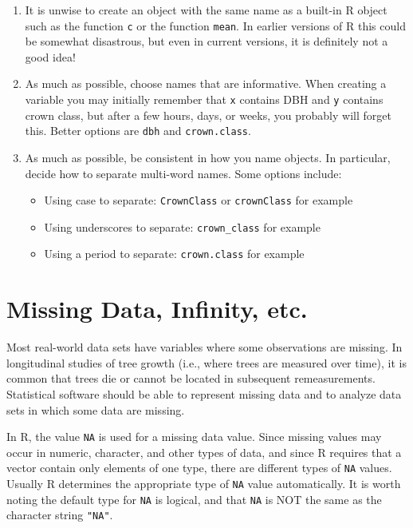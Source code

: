 \documentclass[]{krantz}
\providecommand{\tightlist}{%
  \setlength{\itemsep}{0pt}\setlength{\parskip}{0pt}}
\begin{document}
\begin{enumerate}
\def\labelenumi{\arabic{enumi}.}
\setcounter{enumi}{1}
\item
  It is unwise to create an object with the same name as a built-in R object such as the function \texttt{c} or the function \texttt{mean}. In earlier versions of R this could be somewhat disastrous, but even in current versions, it is definitely not a good idea!
\item
  As much as possible, choose names that are informative. When creating a variable you may initially remember that \texttt{x} contains DBH and \texttt{y} contains crown class, but after a few hours, days, or weeks, you probably will forget this. Better options are \texttt{dbh} and \texttt{crown.class}.
\item
  As much as possible, be consistent in how you name objects. In particular, decide how to separate multi-word names. Some options include:

  \begin{itemize}
  \tightlist
  \item
    Using case to separate: \texttt{CrownClass} or \texttt{crownClass} for example
  \item
    Using underscores to separate: \texttt{crown\_class} for example
  \item
    Using a period to separate: \texttt{crown.class} for example
  \end{itemize}
\end{enumerate}

\hypertarget{missing-data-infinity-etc.}{%
\section{Missing Data, Infinity, etc.}\label{missing-data-infinity-etc.}}

Most real-world data sets have variables where some observations are missing. In longitudinal studies of tree growth (i.e., where trees are measured over time), it is common that trees die or cannot be located in subsequent remeasurements. Statistical software should be able to represent missing data and to analyze data sets in which some data are missing.

In R, the value \texttt{NA} is used for a missing data value. Since missing values may occur in numeric, character, and other types of data, and since R requires that a vector contain only elements of one type, there are different types of \texttt{NA} values. Usually R determines the appropriate type of \texttt{NA} value automatically. It is worth noting the default type for \texttt{NA} is logical, and that \texttt{NA} is NOT the same as the character string \texttt{"NA"}.
\end{document}
